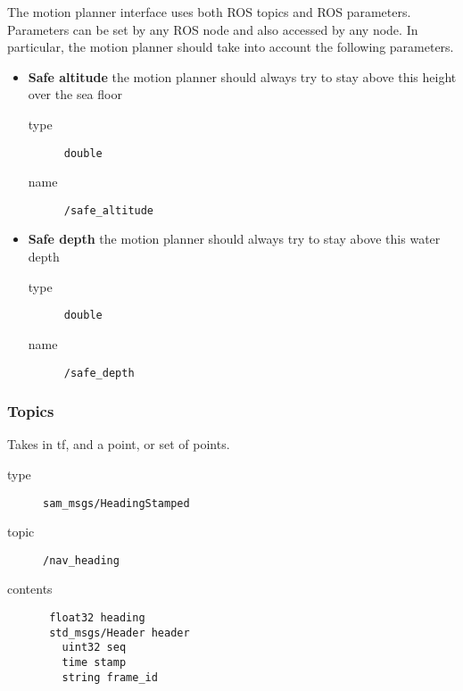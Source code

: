 \documentclass[9pt,technote]{IEEEtran} %
\begin{document}
The motion planner interface uses both ROS topics and ROS parameters.
Parameters can be set by any ROS node and also accessed by any node.
In particular, the motion planner should take into account the following parameters.
\begin{itemize}
\item \textbf{Safe altitude} the motion planner should always try to stay above this height over the sea floor \begin{description}
\item[type] \texttt{double}
\item[name] \texttt{/safe\_altitude}
\end{description}
\item \textbf{Safe depth} the motion planner should always try to stay above this water depth \begin{description}
\item[type] \texttt{double}
\item[name] \texttt{/safe\_depth}
\end{description}  
\end{itemize}

\subsubsection{Topics}


Takes in tf, and a point, or set of points.

\begin{description}
\item[type] \texttt{sam\_msgs/HeadingStamped}
\item[topic] \texttt{/nav\_heading}
\item[contents] \begin{scriptsize}
\begin{verbatim}
 float32 heading
 std_msgs/Header header
   uint32 seq
   time stamp
   string frame_id
\end{verbatim}
\end{scriptsize}
\end{description}
\end{document}
